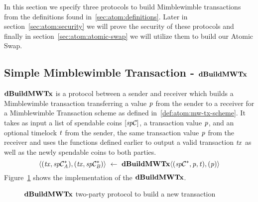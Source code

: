 In this section we specify three protocols to build Mimblewimble transactions from the definitions found in~\cref{sec:atom:definitions}.
Later in section~\cref{sec:atom:security} we will prove the security of these protocols and finally in section~\cref{sec:atom:atomic-swap} we will utilize them to build our Atomic Swap.

\subsection{Simple Mimblewimble Transaction - $\mathbf{dBuildMWTx}$} \label{subsec:atom:simple-mw-tx}

$\mathbf{dBuildMWTx}$ is a protocol between a sender and receiver which builds a Mimblewimble transaction transferring a value $\mathit{p}$ from the sender to a receiver for a Mimblewimble Transaction scheme as defined in~\cref{def:atom:mw-tx-scheme}.
It takes as input a list of spendable coins $[\mathit{sp}\mathcal{C}]$, a transaction value $\mathit{p}$, and an optional timelock $\mathit{t}$ from the sender, the same transaction value $\mathit{p}$ from the receiver and uses the functions defined earlier to output a valid transaction $\mathit{tx}$ as well as the newly spendable coins to both parties.
\[ \langle (\mathit{tx}, \mathit{sp}\mathcal{C}_{\mathit{A}}^*), (\mathit{tx}, \mathit{sp}\mathcal{C}_{\mathit{B}}^*) \rangle ~\leftarrow~ \mathbf{dBuildMWTx} \langle(\mathit{sp}\mathcal{C}^*,\mathit{p},\mathit{t}), (\mathit{p})\rangle \]
Figure~\cref{fig:d-build-mw-tx} shows the implementation of the $\mathbf{dBuildMWTx}$.

\begin{figure}
    \caption{$\mathbf{dBuildMWTx}$ two-party protocol to build a new transaction} \label{fig:d-build-mw-tx}
\end{figure}

